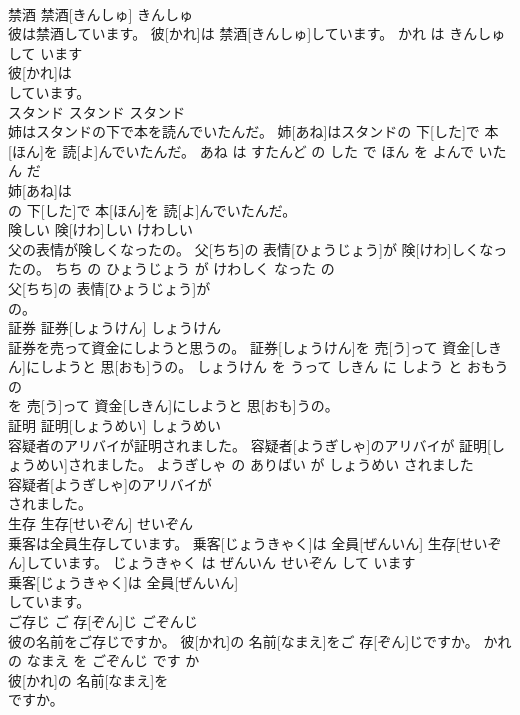 \documentclass[8pt]{extreport}
\begin{document}
\begin{CJK}{UTF8}{min}
\\	禁酒	禁酒[きんしゅ]	きんしゅ	
\\	彼は禁酒しています。	彼[かれ]は 禁酒[きんしゅ]しています。	かれ は きんしゅ して います	
\\	彼[かれ]は
\\	しています。			
\\	スタンド	スタンド	スタンド	
\\	姉はスタンドの下で本を読んでいたんだ。	姉[あね]はスタンドの 下[した]で 本[ほん]を 読[よ]んでいたんだ。	あね は すたんど の した で ほん を よんで いた ん だ	
\\	姉[あね]は
\\	の 下[した]で 本[ほん]を 読[よ]んでいたんだ。			
\\	険しい	険[けわ]しい	けわしい	
\\	父の表情が険しくなったの。	父[ちち]の 表情[ひょうじょう]が 険[けわ]しくなったの。	ちち の ひょうじょう が けわしく なった の	
\\	父[ちち]の 表情[ひょうじょう]が
\\	の。			
\\	証券	証券[しょうけん]	しょうけん	
\\	証券を売って資金にしようと思うの。	証券[しょうけん]を 売[う]って 資金[しきん]にしようと 思[おも]うの。	しょうけん を うって しきん に しよう と おもう の	
\\	を 売[う]って 資金[しきん]にしようと 思[おも]うの。			
\\	証明	証明[しょうめい]	しょうめい	
\\	容疑者のアリバイが証明されました。	容疑者[ようぎしゃ]のアリバイが 証明[しょうめい]されました。	ようぎしゃ の ありばい が しょうめい されました	
\\	容疑者[ようぎしゃ]のアリバイが
\\	されました。			
\\	生存	生存[せいぞん]	せいぞん	
\\	乗客は全員生存しています。	乗客[じょうきゃく]は 全員[ぜんいん] 生存[せいぞん]しています。	じょうきゃく は ぜんいん せいぞん して います	
\\	乗客[じょうきゃく]は 全員[ぜんいん]
\\	しています。			
\\	ご存じ	ご 存[ぞん]じ	ごぞんじ	
\\	彼の名前をご存じですか。	彼[かれ]の 名前[なまえ]をご 存[ぞん]じですか。	かれ の なまえ を ごぞんじ です か	
\\	彼[かれ]の 名前[なまえ]を
\\	ですか。			

\end{CJK}
\end{document}
